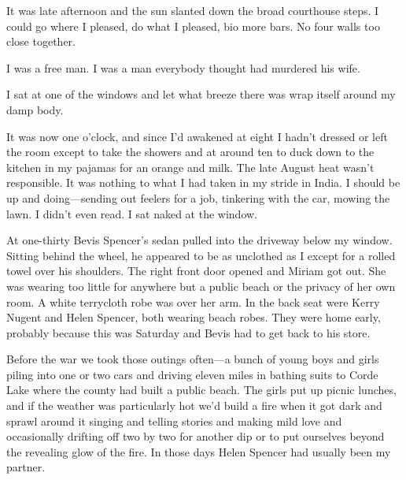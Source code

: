 \documentclass{novel}
\begin{document}
It was late afternoon and the sun slanted down the broad courthouse steps. I could go where I pleased, do what I pleased, bio more bars. No four walls too close together.

I was a free man. I was a man everybody thought had murdered his wife.

\vspace{2\nbs}
\clearpage
\thispagestyle{empty}


\begin{ChapterStart}
\vspace{3\nbs}
\end{ChapterStart}

I sat at one of the windows and let what breeze there was wrap itself around my damp body.

It was now one o’clock, and since I’d awakened at eight I hadn’t dressed or left the room except to take the showers and at around ten to duck down to the kitchen in my pajamas for an orange and milk. The late August heat wasn’t responsible. It was nothing to what I had taken in my stride in India. I should be up and doing—sending out feelers for a job, tinkering with the car, mowing the lawn. I didn’t even read. I sat naked at the window.

At one-thirty Bevis Spencer’s sedan pulled into the driveway below my window. Sitting behind the wheel, he appeared to be as unclothed as I except for a rolled towel over his shoulders. The right front door opened and Miriam got out. She was wearing too little for anywhere but a public beach or the privacy of her own room. A white terrycloth robe was over her arm. In the back seat were Kerry Nugent and Helen Spencer, both wearing beach robes. They were home early, probably because this was Saturday and Bevis had to get back to his store.

Before the war we took those outings often—a bunch of young boys and girls piling into one or two cars and driving eleven miles in bathing suits to Corde Lake where the county had built a public beach. The girls put up picnic lunches, and if the weather was particularly hot we’d build a fire when it got dark and sprawl around it singing and telling stories and making mild love and occasionally drifting off two by two for another dip or to put ourselves beyond the revealing glow of the fire. In those days Helen Spencer had usually been my partner.
\end{document}
